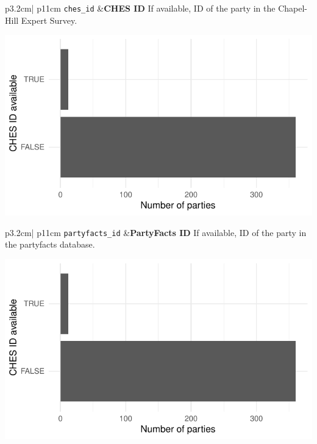 \documentclass[
]{article}
\begin{document}
\begin{longtable}{p{3.2cm}| p{11cm}}
\texttt{ches\_id} &\textbf{CHES ID}\newline 
If available, ID of the party in the Chapel-Hill Expert Survey.


\hspace*{.25cm}
\begin{minipage}[t]{\linewidth }
\vspace{0pt}
\includegraphics[width = \linewidth]{cbelec/chesplot.pdf}
\end{minipage}



\end{longtable}

\begin{longtable}{p{3.2cm}| p{11cm}}
\texttt{partyfacts\_id} &\textbf{PartyFacts ID}\newline 
If available, ID of the party in the partyfacts database.

\hspace*{.25cm}
\begin{minipage}[t]{\linewidth }
\vspace{0pt}
\includegraphics[width = \linewidth]{cbelec/partyfactsplot.pdf}
\end{minipage}



\end{longtable}
\end{document}
